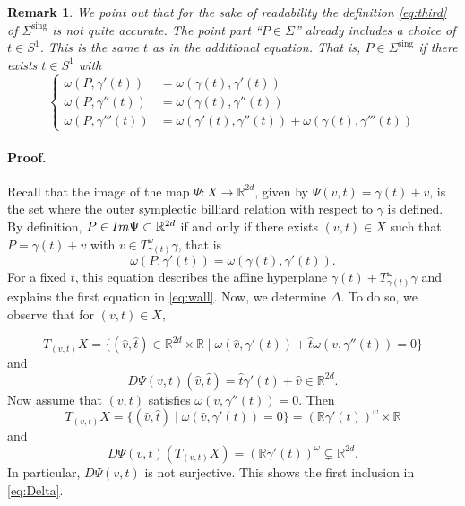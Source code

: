 \documentclass[12pt]{article}
\newtheorem{remark}[lemma]{Remark}
\newcommand{\R}{{\mathbb R}}
\def\proof{\paragraph{Proof.}}
\begin{document}
\begin{remark}
{\rm
We point out that for the sake of readability the definition \eqref{eq:third} of $\Sigma^{\mathrm{sing}}$ is not quite accurate. The point part ``$P\in\Sigma$'' already includes a choice of $t\in S^1$. This is the same $t$ as in the additional equation. That is, $P\in \Sigma^{\mathrm{sing}}$ if there exists $t\in S^1$  with
\begin{equation}\label{eq:third_all_eqns}
\left\{
\begin{aligned}
\omega(P,\gamma'(t))&=\omega(\gamma(t),\gamma'(t))\\ 
\omega(P,\gamma''(t))&=\omega(\gamma(t),\gamma''(t))\\
\omega(P,\gamma'''(t))&=\omega(\gamma'(t),\gamma''(t)) +\omega(\gamma(t),\gamma'''(t)) 
\end{aligned}
\right.
\end{equation}
} 
\end{remark}


\proof

Recall  that the image of the map $\Psi:X\to\R^{2d}$, given by $\Psi(v,t)=\gamma(t)+v$, is the set where the outer symplectic billiard relation with respect to $\gamma$ is defined. By definition, $P\in {\rm Im} \Psi\subset \R^{2d}$ if and only if there exists $(v,t)\in X$ such that $P=\gamma(t)+v$ with $v\in T_{\gamma(t)}^\omega\gamma$, that is
\begin{equation} \label{eq:first}
\omega(P,\gamma'(t))=\omega(\gamma(t),\gamma'(t)).
\end{equation} 
For a fixed $t$, this equation describes the affine hyperplane $\gamma(t)+T_{\gamma(t)}^\omega\gamma$ and explains the first equation in \eqref{eq:wall}. Now, we determine $\Delta$. To do so, we observe that for $(v,t) \in X$,

\begin{equation}\nonumber
T_{(v,t)}X=\{(\hat v,\hat t)\in\R^{2d}\times\R\mid \omega(\hat v,\gamma'(t))+\hat t\omega(v,\gamma''(t))=0\}
\end{equation}
and
\begin{equation}\nonumber
D\Psi(v,t)(\hat v,\hat t)=\hat t\gamma'(t)+\hat v\in \R^{2d}.
\end{equation}
Now assume that $(v,t)$ satisfies $\omega(v,\gamma''(t))=0$. Then 
\begin{equation}\nonumber
T_{(v,t)}X=\{(\hat v,\hat t)\mid \omega(\hat v,\gamma'(t))=0\}=(\R\gamma'(t))^\omega\times\R
\end{equation}
and 
\begin{equation}\nonumber
D\Psi(v,t)(T_{(v,t)}X)=(\R\gamma'(t))^\omega\subsetneq\R^{2d}.
\end{equation}
In particular, $D\Psi(v,t)$ is not surjective. This shows the first inclusion in \eqref{eq:Delta}. 
\end{document}
